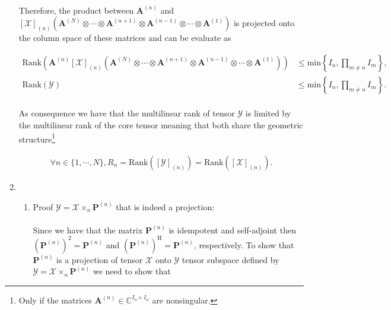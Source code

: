 \documentclass[a4paper,10pt]{article}
\begin{document}
\begin{enumerate}
        \paragraph{}Therefore, the product between $\boldsymbol{A}^{(n)}$ and $\left[ \mathcal{X} \right]_{(n)} \left( \boldsymbol{A}^{(N)} \otimes \cdots \otimes \boldsymbol{A}^{(n+1)} \otimes \boldsymbol{A}^{(n-1)} \otimes \cdots \otimes \boldsymbol{A}^{(1)} \right) $ is projected onto the column space of these matrices and can be evaluate as
        
        \begin{align}
            \text{Rank}\left( \boldsymbol{A}^{(n)} \left[ \mathcal{X} \right]_{(n)} \left( \boldsymbol{A}^{(N)} \otimes \cdots \otimes \boldsymbol{A}^{(n+1)} \otimes \boldsymbol{A}^{(n-1)} \otimes \cdots \otimes \boldsymbol{A}^{(1)} \right) \right) &\leq \text{min} \left\{ I_{n}, \prod_{m \neq n} I_{m} \right\}, \\
            \text{Rank}\left( \mathcal{Y} \right) &\leq \text{min} \left\{ I_{n}, \prod_{m \neq n} I_{m} \right\}.
        \end{align}
        
        \paragraph{}As consequence we have that the multilinear rank of tensor $\mathcal{Y}$ is limited by the multilinear rank of the core tensor meaning that both share the geometric structure\footnote{Only if the matrices $\boldsymbol{A}^{(n)} \in \mathbb{C}^{I_{n} \times I_{n}}$ are nonsingular.}
        
        \begin{align}
            \forall n \in \{1, \cdots, N\}, R_{n} = \text{Rank}\left( \left[ \mathcal{Y} \right]_{(n)} \right) = \text{Rank}\left( \left[ \mathcal{X} \right]_{(n)} \right).
        \end{align}
    
    \item 
        
        \begin{enumerate}
        
            \item Proof $\mathcal{Y} = \mathcal{X} \times_{n} \boldsymbol{P}^{(n)}$ that is indeed a projection:
            
            \paragraph{}Since we have that the matrix $\boldsymbol{P}^{(n)}$ is idempotent and self-adjoint then $\left(\boldsymbol{P}^{(n)}\right)^2 = \boldsymbol{P}^{(n)}$ and $\left(\boldsymbol{P}^{(n)}\right)^{\text{H}} = \boldsymbol{P}^{(n)}$, respectively. To show that $\boldsymbol{P}^{(n)}$ is a projection of tensor $\mathcal{X}$ onto $\mathcal{Y}$ tensor subspace defined by $\mathcal{Y} = \mathcal{X} \times_{n} \boldsymbol{P}^{(n)}$ we need to show that
        

\end{enumerate}
\end{enumerate}
\end{document}
